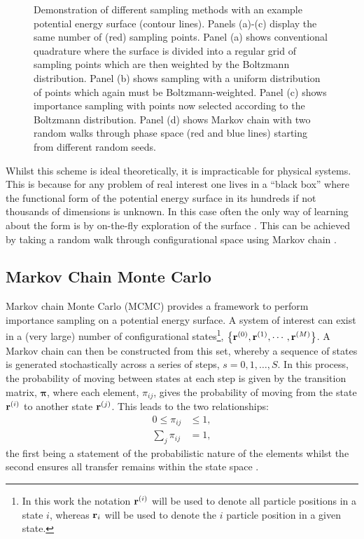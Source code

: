 \begin{figure}[btp]
     \caption{Demonstration of different sampling methods with an example \td{} potential energy surface (contour lines). Panels (a)\--(c) display the same number of (red) sampling points. Panel (a) shows conventional quadrature where the surface is divided into a regular grid of sampling points which are then weighted by the Boltzmann distribution. Panel (b) shows \mc{} sampling with a uniform distribution of points which again must be Boltzmann\--weighted. Panel (c) shows \mc{} importance sampling with points now selected according to the Boltzmann distribution. Panel (d) shows Markov chain \mc{} with two random walks through phase space (red and blue lines) starting from different random seeds.}
     \label{fig:montecarloint}
\end{figure}

Whilst this scheme is ideal theoretically, it is impracticable for physical systems.
This is because for any problem of real interest one lives in a ``black box'' where the functional form of the potential energy surface in its hundreds if not thousands of dimensions is unknown.
In this case often the only way of learning about the form is by on\--the\--fly exploration of the surface \cite{Brooks2011}.
This can be achieved by taking a random walk through configurational space using Markov chain \mc.

\subsection{Markov Chain Monte Carlo}

Markov chain Monte Carlo (MCMC) provides a framework to perform importance sampling on a potential energy surface.
A system of interest can exist in a (very large) number of configurational states\footnote{In this work the notation $\mathbf{r}^{\left(i\right)}$ will be used to denote all particle positions in a state $i$, whereas $\mathbf{r}_{i}$ will be used to denote the $i$\th{} particle position in a given state.}, $\left\{\mathbf{r}^{\left(0\right)},\mathbf{r}^{\left(1\right)},\cdots,\mathbf{r}^{\left(M\right)}\right\}$.
A Markov chain can then be constructed from this set, whereby a sequence of states is generated stochastically across a series of steps, $s=0,1,\dots,S$.
In this process, the probability of moving between states at each step is given by the transition matrix, $\bm{\pi}$, where each element, $\pi_{ij}$, gives the probability of moving from the state $\mathbf{r}^{\left(i\right)}$ to another state $\mathbf{r}^{\left(j\right)}$.  
This leads to the two relationships:
\begin{align}
	0\leq \pi_{ij} &\leq 1, \\
	\sum_{j} \pi_{ij} &= 1, \label{eq:tmrowsum}
\end{align}
the first being a statement of the probabilistic nature of the elements whilst the second ensures all transfer remains within the state space \cite{Frenkel2002,Allen2017,Brooks2011}.

